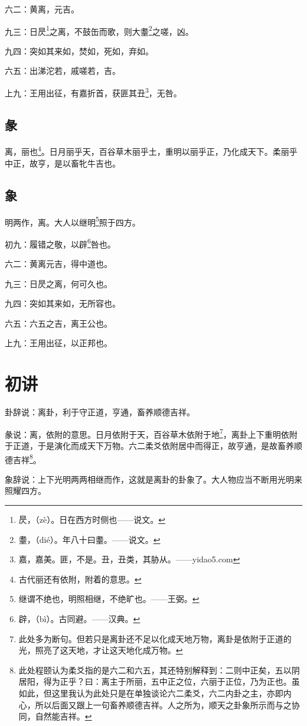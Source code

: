 \documentclass[12pt,oneside]{book}
\begin{document}
六二：黄离，元吉。

九三：日昃\footnote{昃，（zè）。日在西方时侧也——说文。}之离，不鼓缶而歌，则大耋\footnote{耋，（dié）。年八十曰耋。——说文。}之嗟，凶。

九四：突如其来如，焚如，死如，弃如。

六五：出涕沱若，戚嗟若，吉。

上九：王用出征，有嘉折首，获匪其丑\footnote{嘉，嘉美。匪，不是。丑，丑类，其胁从。——yidao5.com}，无咎。

\subsection{彖}
离，丽也\footnote{古代丽还有依附，附着的意思。}。日月丽乎天，百谷草木丽乎土，重明以丽乎正，乃化成天下。柔丽乎中正，故亨，是以畜牝牛吉也。

\subsection{象}
明两作，离。大人以继明\footnote{继谓不绝也，明照相继，不绝旷也。——王弼。}照于四方。

初九：履错之敬，以辟\footnote{辟，（bì）。古同避。——汉典。}咎也。

六二：黄离元吉，得中道也。

九三：日昃之离，何可久也。

九四：突如其来如，无所容也。

六五：六五之吉，离王公也。

上九：王用出征，以正邦也。

\section{初讲}
卦辞说：离卦，利于守正道，亨通，畜养顺德吉祥。

彖说：离，依附的意思。日月依附于天，百谷草木依附于地\footnote{此处多为断句。但若只是离卦还不足以化成天地万物，离卦是依附于正道的光，照亮了这天地，才让这天地化成万物。}，离卦上下重明依附于正道，于是演化而成天下万物。六二柔爻依附居中而得正，故亨通，是故畜养顺德吉祥\footnote{此处程颐认为柔爻指的是六二和六五，其还特别解释到：二则中正矣，五以阴居阳，得为正乎？曰：离主于所丽，五中正之位，六丽于正位，乃为正也。虽如此，但这里我认为此处只是在单独谈论六二柔爻，六二内卦之主，亦即内心，所以后面又跟上一句畜养顺德吉祥。人之所为，顺天之卦象所示而与之协同，自然能吉祥。}。

象辞说：上下光明两两相继而作，这就是离卦的卦象了。大人物应当不断用光明来照耀四方。
\end{document}
